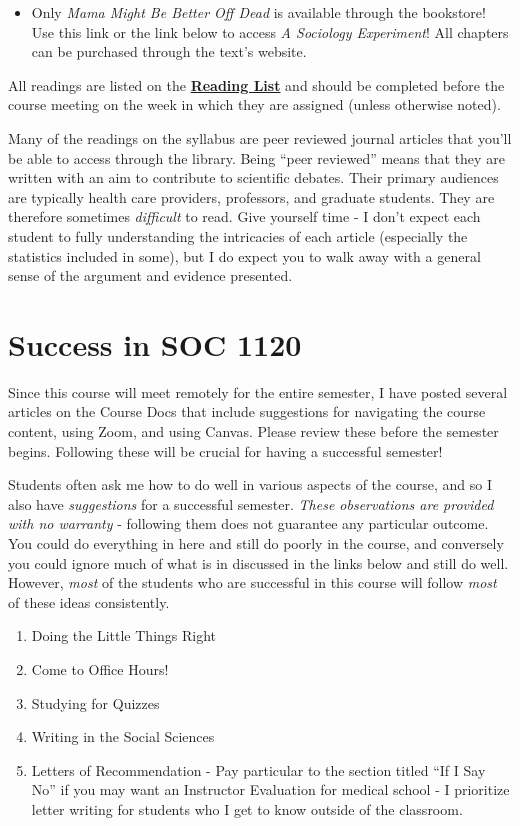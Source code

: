 \documentclass[
]{book}
\providecommand{\tightlist}{%
  \setlength{\itemsep}{0pt}\setlength{\parskip}{0pt}}
\newenvironment{rmdblock}[1]
  {\begin{shaded*}
  \begin{itemize}
  \renewcommand{\labelitemi}{
    \raisebox{-.7\height}[0pt][0pt]{
      {\setkeys{Gin}{width=3em,keepaspectratio}\texttt{[image: images/\#1]}}
    }
  }
  \item
  }
  {
  \end{itemize}
  \end{shaded*}
  }
\newenvironment{rmdwarning}
  {\begin{rmdblock}{warning}}
  {\end{rmdblock}}
\begin{document}
\begin{rmdwarning}
Only \emph{Mama Might Be Better Off Dead} is available through the
bookstore! Use this link or the link below to access \emph{A Sociology
Experiment}! All chapters can be purchased through the text's website.
\end{rmdwarning}

All readings are listed on the \href{/syllabus/lecture-schedule.html}{\textbf{Reading List}} and should be completed before the course meeting on the week in which they are assigned (unless otherwise noted).

Many of the readings on the syllabus are peer reviewed journal articles that you'll be able to access through the library. Being ``peer reviewed'' means that they are written with an aim to contribute to scientific debates. Their primary audiences are typically health care providers, professors, and graduate students. They are therefore sometimes \emph{difficult} to read. Give yourself time - I don't expect each student to fully understanding the intricacies of each article (especially the statistics included in some), but I do expect you to walk away with a general sense of the argument and evidence presented.

\hypertarget{success-in-soc-1120}{%
\section{Success in SOC 1120}\label{success-in-soc-1120}}

Since this course will meet remotely for the entire semester, I have posted several articles on the Course Docs that include suggestions for navigating the course content, using Zoom, and using Canvas. Please review these before the semester begins. Following these will be crucial for having a successful semester!

Students often ask me how to do well in various aspects of the course, and so I also have \emph{suggestions} for a successful semester. \emph{These observations are provided with no warranty} - following them does not guarantee any particular outcome. You could do everything in here and still do poorly in the course, and conversely you could ignore much of what is in discussed in the links below and still do well. However, \emph{most} of the students who are successful in this course will follow \emph{most} of these ideas consistently.

\begin{enumerate}
\def\labelenumi{\arabic{enumi}.}
\tightlist
\item
  Doing the Little Things Right
\item
  Come to Office Hours!
\item
  Studying for Quizzes
\item
  Writing in the Social Sciences
\item
  Letters of Recommendation - Pay particular to the section titled ``If I Say No'' if you may want an Instructor Evaluation for medical school - I prioritize letter writing for students who I get to know outside of the classroom.
\end{enumerate}
\end{document}
